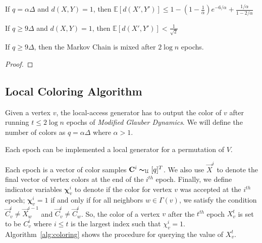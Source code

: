 \begin{lemma}
\label{lem:mohsen_single_epoch_distance}
If $q = \alpha\Delta$ and $d(X, Y) = 1$, then $\mathbb E[d(X',Y')] \le 1-\left( 1-\frac1\alpha\right)e^{-6/\alpha} + \frac{1/\alpha}{1-2/\alpha}$
\end{lemma}
\begin{corollary}
\label{cor:single_epoch_distansce}
If $q \ge 9\Delta$ and $d(X, Y) = 1$, then $\mathbb E[d(X',Y')] < \frac1{\sqrt{2}}$
\end{corollary}

\begin{theorem}
\label{thm:modified_mixing_time}
If $q\ge 9\Delta$, then the Markov Chain is mixed after $2\log n$ epochs.
\end{theorem}
\begin{proof}
\end{proof}




\subsection{Local Coloring Algorithm}%
\label{sub:local_coloring_algortihm}
Given a vertex $v$, the local-access generator has to output the color of $v$ after running $t \le 2\log n$ epochs of \emph{Modified Glauber Dynamics}.
We will define the number of colors as $q = \alpha\Delta$ where $\alpha > 1$.

Each epoch can be implemented a local generator for a permutation of $V$.


Each epoch is a vector of color samples $\vec C^{i} \thicksim_{\mathcal U} [q]^T$.
We also use $\vec X^i$ to denote the final vector of vertex colors at the end of the $i^{th}$ epoch.
Finally, we define indicator variables $\bm \chi^i_v$ to denote if the color for vertex $v$ was accepted at the $i^{th}$ epoch;
$\bm \chi^i_v = 1$ if and only if for all neighbors $w\in \Gamma(v)$,
we satisfy the condition $\vec  C^i_v\not= \vec X^{i-1}_w$ and $\vec C^i_v\not= \vec C^i_w$.
So, the color of a vertex $v$ after the $t^{th}$ epoch $X^t_v$ is set to be $C^i_v$
where $i\le t$ is the largest index such that $\chi^i_v=1$.
Algorithm~\ref{alg:coloring} shows the procedure for querying the value of $X^t_v$.

